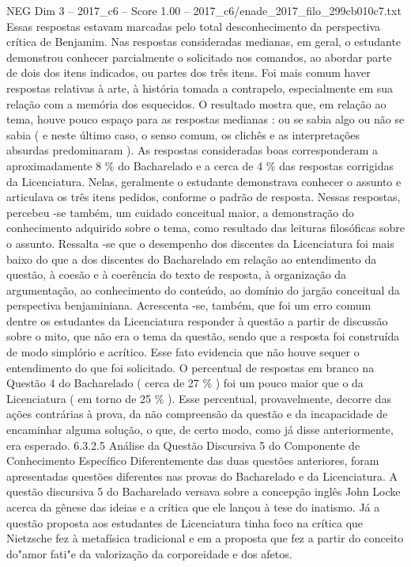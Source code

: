 \begin{textsample}{NEG Dim 3 – 2017\_c6 – Score 1.00 – 2017\_c6/enade\_2017\_filo\_299cb010c7.txt}
Essas respostas estavam marcadas pelo total desconhecimento da perspectiva crítica de Benjamim.
Nas respostas consideradas medianas, em geral, o estudante demonstrou conhecer parcialmente o solicitado nos comandos, ao abordar parte de dois dos itens indicados, ou partes dos três itens.
Foi mais comum haver respostas relativas à arte, à história tomada a contrapelo, especialmente em sua relação com a memória dos esquecidos.
O resultado mostra que, em relação ao tema, houve pouco espaço para as respostas medianas : ou se sabia algo ou não se sabia ( e neste último caso, o senso comum, os clichês e as interpretações absurdas predominaram ).
As respostas consideradas boas corresponderam a aproximadamente 8 \% do Bacharelado e a cerca de 4 \% das respostas corrigidas da Licenciatura.
Nelas, geralmente o estudante demonstrava conhecer o assunto e articulava os três itens pedidos, conforme o padrão de resposta.
Nessas respostas, percebeu -se também, um cuidado conceitual maior, a demonstração do conhecimento adquirido sobre o tema, como resultado das leituras filosóficas sobre o assunto.
Ressalta -se que o desempenho dos discentes da Licenciatura foi mais baixo do que a dos discentes do Bacharelado em relação ao entendimento da questão, à coesão e à coerência do texto de resposta, à organização da argumentação, ao conhecimento do conteúdo, ao domínio do jargão conceitual da perspectiva benjaminiana.
Acrescenta -se, também, que foi um erro comum dentre os estudantes da Licenciatura responder à questão a partir de discussão sobre o mito, que não era o tema da questão, sendo que a resposta foi construída de modo simplório e acrítico.
Esse fato evidencia que não houve sequer o entendimento do que foi solicitado.
O percentual de respostas em branco na Questão 4 do Bacharelado ( cerca de 27 \% ) foi um pouco maior que o da Licenciatura ( em torno de 25 \% ).
Esse percentual, provavelmente, decorre das ações contrárias à prova, da não compreensão da questão e da incapacidade de encaminhar alguma solução, o que, de certo modo, como já disse anteriormente, era esperado. 6.3.2.5 Análise da Questão Discursiva 5 do Componente de Conhecimento Específico Diferentemente das duas questões anteriores, foram apresentadas questões diferentes nas provas do Bacharelado e da Licenciatura.
A questão discursiva 5 do Bacharelado versava sobre a concepção inglês John Locke acerca da gênese das ideias e a crítica que ele lançou à tese do inatismo.
Já a questão proposta aos estudantes de Licenciatura tinha foco na crítica que Nietzsche fez à metafísica tradicional e em a proposta que fez a partir do conceito do"amor fati"e da valorização da corporeidade e dos afetos.

\end{textsample}
